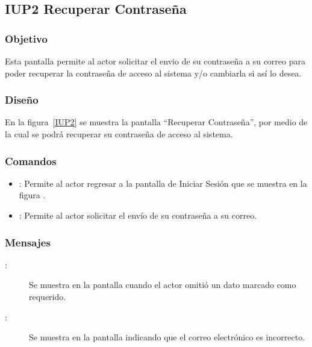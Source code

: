 \subsection{IUP2 Recuperar Contraseña}
 
\subsubsection{Objetivo}

    Esta pantalla permite al actor solicitar el envio de su contraseña a su correo para poder recuperar la contraseña de acceso al sistema y/o cambiarla si así lo desea.

\subsubsection{Diseño}

    En la figura~\ref{IUP2} se muestra la pantalla ``Recuperar Contraseña'', por medio de la cual se podrá recuperar su contraseña de acceso al sistema. \\
	\newpage

\subsubsection{Comandos}
\begin{itemize}
    \item {}: Permite al actor regresar a la pantalla de Iniciar Sesión que se muestra en la figura .
    \item {}: Permite al actor solicitar el envío de su contraseña a su correo.
  
\end{itemize}

\subsubsection{Mensajes}

\begin{description}
    \item[:] Se muestra en la pantalla  cuando el actor omitió un dato marcado como requerido.
    \item[:] Se muestra en la pantalla  indicando que el correo electrónico es incorrecto.
\end{description}
